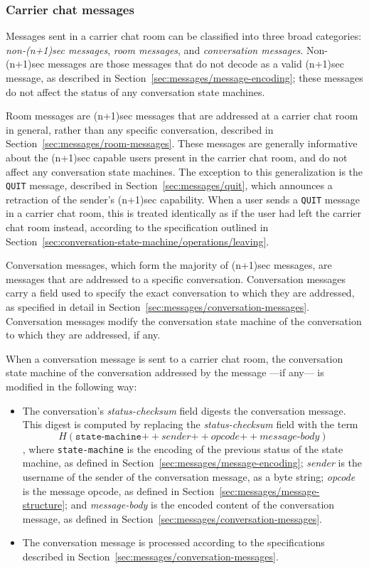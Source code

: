 \documentclass{article}
\def\message#1{\texttt{#1}}
\def\field#1{\textit{#1}}
\def\smfield#1{\textsl{#1}}
\def\concat{\mathbin{+\!\!\!+}}
\begin{document}
\subsubsection{Carrier chat messages}
\label{sec:conversation-state-machine/operations/messages}

Messages sent in a carrier chat room can be classified into three broad categories: \emph{non-(n+1)sec messages}, \emph{room messages}, and \emph{conversation messages}.
Non-(n+1)sec messages are those messages that do not decode as a valid (n+1)sec message, as described in Section~\ref{sec:messages/message-encoding}; these messages do not affect the status of any conversation state machines.

Room messages are (n+1)sec messages that are addressed at a carrier chat room in general, rather than any specific conversation, described in Section~\ref{sec:messages/room-messages}.
These messages are generally informative about the (n+1)sec capable users present in the carrier chat room, and do not affect any conversation state machines.
The exception to this generalization is the \message{QUIT} message, described in Section~\ref{sec:messages/quit}, which announces a retraction of the sender's (n+1)sec capability.
When a user sends a \message{QUIT} message in a carrier chat room, this is treated identically as if the user had left the carrier chat room instead, according to the specification outlined in Section~\ref{sec:conversation-state-machine/operations/leaving}.

Conversation messages, which form the majority of (n+1)sec messages, are messages that are addressed to a specific conversation.
Conversation messages carry a field used to specify the exact conversation to which they are addressed, as specified in detail in Section~\ref{sec:messages/conversation-messages}.
Conversation messages modify the conversation state machine of the conversation to which they are addressed, if any.

When a conversation message is sent to a carrier chat room, the conversation state machine of the conversation addressed by the message ---if any--- is modified in the following way:
\begin{itemize}
\item The conversation's \smfield{status-checksum} field digests the conversation message. This digest is computed by replacing the \smfield{status-checksum} field with the term
$$H(\texttt{state-machine} \concat \field{sender} \concat \field{opcode} \concat \field{message-body})$$
, where \texttt{state-machine} is the encoding of the previous status of the state machine, as defined in Section~\ref{sec:messages/message-encoding}; \field{sender} is the username of the sender of the conversation message, as a byte string; \field{opcode} is the message opcode, as defined in Section~\ref{sec:messages/message-structure}; and \field{message-body} is the encoded content of the conversation message, as defined in Section~\ref{sec:messages/conversation-messages}.
\item The conversation message is processed according to the specifications described in Section~\ref{sec:messages/conversation-messages}.
\end{itemize}
\end{document}
